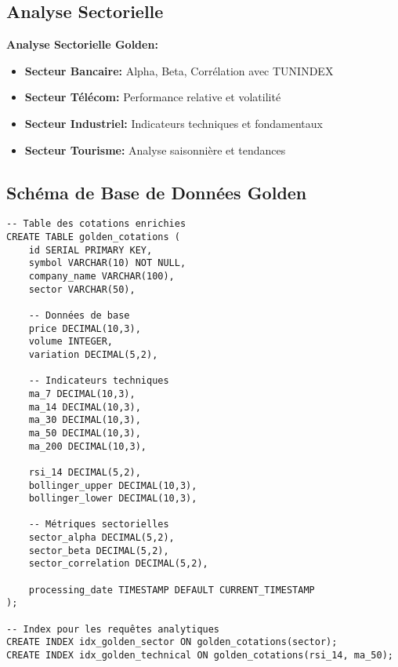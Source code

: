 \subsection{Analyse Sectorielle}


\textbf{Analyse Sectorielle Golden:}
\begin{itemize}
    \item \textbf{Secteur Bancaire:} Alpha, Beta, Corrélation avec TUNINDEX
    \item \textbf{Secteur Télécom:} Performance relative et volatilité
    \item \textbf{Secteur Industriel:} Indicateurs techniques et fondamentaux
    \item \textbf{Secteur Tourisme:} Analyse saisonnière et tendances
\end{itemize}

\subsection{Schéma de Base de Données Golden}

\begin{verbatim}
-- Table des cotations enrichies
CREATE TABLE golden_cotations (
    id SERIAL PRIMARY KEY,
    symbol VARCHAR(10) NOT NULL,
    company_name VARCHAR(100),
    sector VARCHAR(50),
    
    -- Données de base
    price DECIMAL(10,3),
    volume INTEGER,
    variation DECIMAL(5,2),
    
    -- Indicateurs techniques
    ma_7 DECIMAL(10,3),
    ma_14 DECIMAL(10,3),
    ma_30 DECIMAL(10,3),
    ma_50 DECIMAL(10,3),
    ma_200 DECIMAL(10,3),
    
    rsi_14 DECIMAL(5,2),
    bollinger_upper DECIMAL(10,3),
    bollinger_lower DECIMAL(10,3),
    
    -- Métriques sectorielles
    sector_alpha DECIMAL(5,2),
    sector_beta DECIMAL(5,2),
    sector_correlation DECIMAL(5,2),
    
    processing_date TIMESTAMP DEFAULT CURRENT_TIMESTAMP
);

-- Index pour les requêtes analytiques
CREATE INDEX idx_golden_sector ON golden_cotations(sector);
CREATE INDEX idx_golden_technical ON golden_cotations(rsi_14, ma_50);
\end{verbatim}

